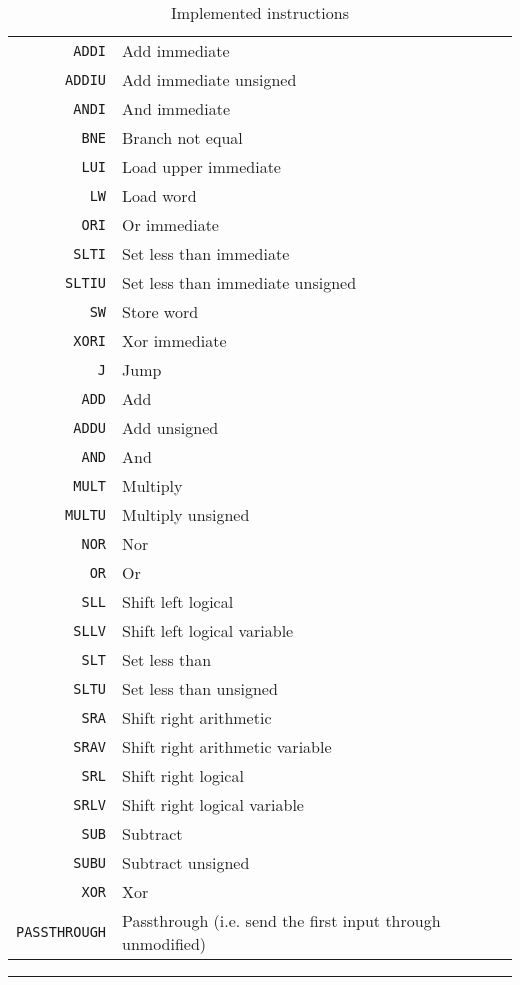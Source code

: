 \begin{table}
    \begin{tabular}{r|l}
        \texttt{ADDI} & Add immediate \\
        \texttt{ADDIU} & Add immediate unsigned \\
        \texttt{ANDI} & And immediate \\
        \texttt{BNE} & Branch not equal \\
        \texttt{LUI} & Load upper immediate \\
        \texttt{LW} & Load word \\
        \texttt{ORI} & Or immediate \\
        \texttt{SLTI} & Set less than immediate \\
        \texttt{SLTIU} & Set less than immediate unsigned \\
        \texttt{SW} & Store word \\
        \texttt{XORI} & Xor immediate \\
        \texttt{J} & Jump \\
        \texttt{ADD} & Add \\
        \texttt{ADDU} & Add unsigned \\
        \texttt{AND} & And \\
        \texttt{MULT} & Multiply \\
        \texttt{MULTU} & Multiply unsigned \\
        \texttt{NOR} & Nor \\
        \texttt{OR} & Or \\
        \texttt{SLL} & Shift left logical \\
        \texttt{SLLV} & Shift left logical variable \\
        \texttt{SLT} & Set less than \\
        \texttt{SLTU} & Set less than unsigned \\
        \texttt{SRA} & Shift right arithmetic \\
        \texttt{SRAV} & Shift right arithmetic variable \\
        \texttt{SRL} & Shift right logical \\
        \texttt{SRLV} & Shift right logical variable \\
        \texttt{SUB} & Subtract \\
        \texttt{SUBU} & Subtract unsigned \\
        \texttt{XOR} & Xor \\
        \texttt{PASSTHROUGH} & Passthrough (i.e. send the first input through unmodified) \\
    \end{tabular}
    \smallskip
    \hrule
    \smallskip
    \caption{Implemented instructions}
    \label{table:implemented-instructions}
\end{table}

